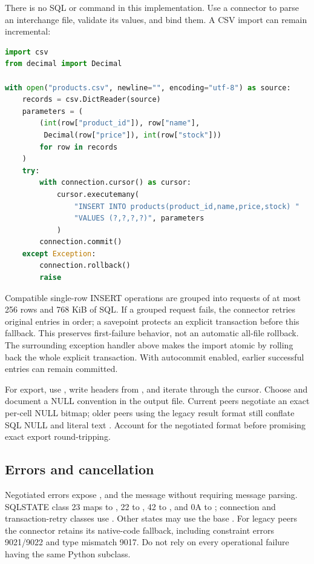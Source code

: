 There is no SQL  or  command in this implementation. Use a connector to parse an interchange file, validate its values, and bind them. A CSV import can remain incremental:

\begin{lstlisting}[language=Python]
import csv
from decimal import Decimal

with open("products.csv", newline="", encoding="utf-8") as source:
    records = csv.DictReader(source)
    parameters = (
        (int(row["product_id"]), row["name"],
         Decimal(row["price"]), int(row["stock"]))
        for row in records
    )
    try:
        with connection.cursor() as cursor:
            cursor.executemany(
                "INSERT INTO products(product_id,name,price,stock) "
                "VALUES (?,?,?,?)", parameters
            )
        connection.commit()
    except Exception:
        connection.rollback()
        raise
\end{lstlisting}

Compatible single-row INSERT operations are grouped into requests of at most 256 rows and 768 KiB of SQL. If a grouped request fails, the connector retries original entries in order; a savepoint protects an explicit transaction before this fallback. This preserves first-failure behavior, not an automatic all-file rollback. The surrounding exception handler above makes the import atomic by rolling back the whole explicit transaction. With autocommit enabled, earlier successful entries can remain committed.

For export, use , write headers from ,
and iterate through the cursor. Choose and document a NULL convention in the
output file. Current peers negotiate an exact per-cell NULL bitmap; older
peers using the legacy result format still conflate SQL NULL and literal text
. Account for the negotiated format before promising exact export
round-tripping.

\subsection{Errors and cancellation}

Negotiated errors expose ,  and the message without
requiring message parsing. SQLSTATE class 23 maps to ,
22 to , 42 to , and 0A to
; connection and transaction-retry classes use
. Other states may use the base .
For legacy peers the connector retains its native-code fallback, including
constraint errors 9021/9022 and type mismatch 9017. Do not rely on every
operational failure having the same Python subclass.

